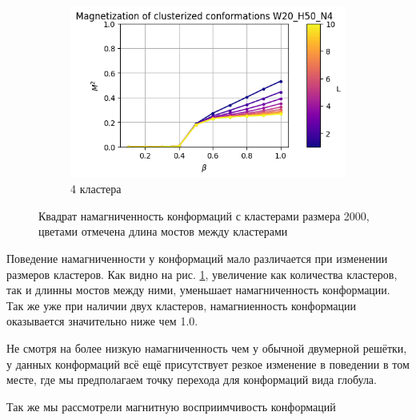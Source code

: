 \documentclass[14pt]{extarticle}
\begin{document}
\begin{figure}[ht]
\begin{subfigure}[t]{0.3\textwidth}
    \end{subfigure}
    \begin{subfigure}[t]{0.3\textwidth}
        \includegraphics*[width=\textwidth]{../images/magnetization_clusterized_W20_H50_N4.png}
        \caption*{4 кластера}
    \end{subfigure}
	\caption{Квадрат намагниченность конформаций с кластерами размера 2000, цветами отмечена длина мостов между кластерами}
	\label{fig:cluster_magnetization}
\end{figure}

Поведение намагниченности у конформаций мало различается при изменении размеров кластеров.
Как видно на рис. \ref{fig:cluster_magnetization}, увеличение как количества кластеров, так и длинны мостов между ними, уменьшает намагниченность конформации. Так же уже при наличии двух кластеров, намагниенность конформации оказывается значительно ниже чем 1.0.

Не смотря на более низкую намагниченность чем у обычной двумерной решётки, у данных конформаций всё ещё присутствует резкое изменение в поведении в том месте, где мы предполагаем точку перехода для конформаций вида глобула.

Так же мы рассмотрели магнитную восприимчивость конформаций
\end{document}
